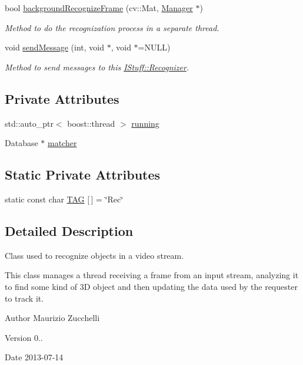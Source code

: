 \begin{DoxyCompactItemize}
bool \hyperlink{class_i_stuff_1_1_recognizer_ad4e54485be9385a287bc51670247b0cc}{background\-Recognize\-Frame} (cv\-::\-Mat, \hyperlink{class_i_stuff_1_1_manager}{Manager} $\ast$)
\begin{DoxyCompactList}\small\item\em Method to do the recognization process in a separate thread. \end{DoxyCompactList}\item 
void \hyperlink{class_i_stuff_1_1_recognizer_a1bb1a4e7045eb4d84d84dac439e9c762}{send\-Message} (int, void $\ast$, void $\ast$=N\-U\-L\-L)
\begin{DoxyCompactList}\small\item\em Method to send messages to this \hyperlink{class_i_stuff_1_1_recognizer}{I\-Stuff\-::\-Recognizer}. \end{DoxyCompactList}\end{DoxyCompactItemize}
\subsection*{Private Attributes}
\begin{DoxyCompactItemize}
\item 
std\-::auto\-\_\-ptr$<$ boost\-::thread $>$ \hyperlink{class_i_stuff_1_1_recognizer_a9460f3d799e5a46ee9861f177e0d9988}{running}
\item 
Database $\ast$ \hyperlink{class_i_stuff_1_1_recognizer_afaba7db86af7bbf83f12472b7fc11e93}{matcher}
\end{DoxyCompactItemize}
\subsection*{Static Private Attributes}
\begin{DoxyCompactItemize}
\item 
static const char \hyperlink{class_i_stuff_1_1_recognizer_a90ec5deceaef320be5e825f653dcf7f1}{T\-A\-G} \mbox{[}$\,$\mbox{]} = \char`\"{}Rec\char`\"{}
\end{DoxyCompactItemize}


\subsection{Detailed Description}
Class used to recognize objects in a video stream. 

This class manages a thread receiving a frame from an input stream, analyzing it to find some kind of 3\-D object and then updating the data used by the requester to track it. \begin{DoxyAuthor}{Author}
Maurizio Zucchelli 
\end{DoxyAuthor}
\begin{DoxyVersion}{Version}
0.. 
\end{DoxyVersion}
\begin{DoxyDate}{Date}
2013-\/07-\/14 
\end{DoxyDate}


